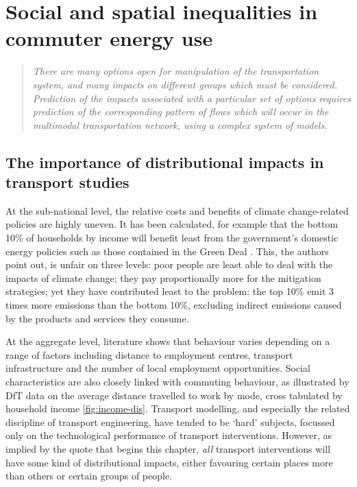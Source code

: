 
\chapter{Social and spatial inequalities in commuter energy use} %
\label{Chapter7}
\fancyhead[RE,LO]{\thepage}
\begin{quotation}
\textit{ There  are many options open  for manipulation of the transportation
system,
and many  impacts on different groups which must
be considered. Prediction of the impacts associated with
a particular set of options requires prediction of the corresponding
pattern of flows which will occur in the multimodal transportation
network, using a complex system of models.}
\end{quotation} {\flushright \citep{manheim1968search}}

\section{The importance of distributional impacts in transport studies}
At the sub-national level, the relative costs and benefits of climate change-related
policies are highly uneven. It has been calculated, for example that the bottom
10\% of households by income will benefit least from the government's domestic
energy policies such as those contained in the Green Deal \citep{JRF2013-distributions}.
This, the authors point out, is unfair on three levels: poor people are least
able to deal with the impacts of climate change; they pay proportionally more for the
mitigation strategies; yet they have contributed least to the problem: the top
10\% emit 3 times more emissions than the bottom 10\%, excluding indirect emissions
caused by the products and services they consume.

At the aggregate level, literature shows that behaviour varies depending
on a range of factors including distance to employment
centres,
transport infrastructure and the number of local employment opportunities.
Social characteristics are also closely linked with commuting behaviour,
as illustrated by DfT data on the average distance travelled to work
by mode, cross tabulated by household income \cref{fig:income-dis}. Transport
modelling, and especially the related discipline of transport engineering, have
tended to be `hard' subjects, focussed only on the technological performance of
transport interventions. However, as implied by the quote that begins this
chapter, \emph{all} transport interventions will have some kind of
distributional impacts, either favouring certain places more than others or
certain groups of people.

